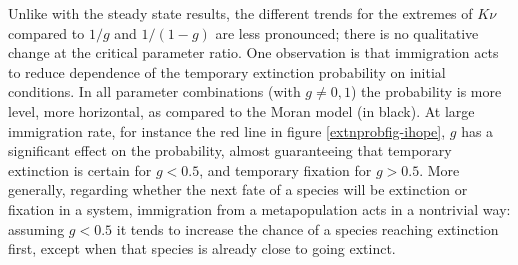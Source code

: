 Unlike with the steady state results, the different trends for the extremes of $K\nu$ compared to $1/g$ and $1/(1-g)$ are less pronounced; there is no qualitative change at the critical parameter ratio. 
One observation is that immigration acts to reduce dependence of the temporary extinction probability on initial conditions. 
In all parameter combinations (with $g\neq 0,1$) the probability is more level, more horizontal, as compared to the Moran model (in black). %
At large immigration rate, for instance the red line in figure \ref{extnprobfig-ihope}, $g$ has a significant effect on the probability, almost guaranteeing that temporary extinction is certain for $g<0.5$, and temporary fixation for $g>0.5$. 
More generally, regarding whether the next fate of a species will be extinction or fixation in a system, immigration from a metapopulation acts in a nontrivial way: assuming $g<0.5$ it tends to increase the chance of a species reaching extinction first, except when that species is already close to going extinct. 


